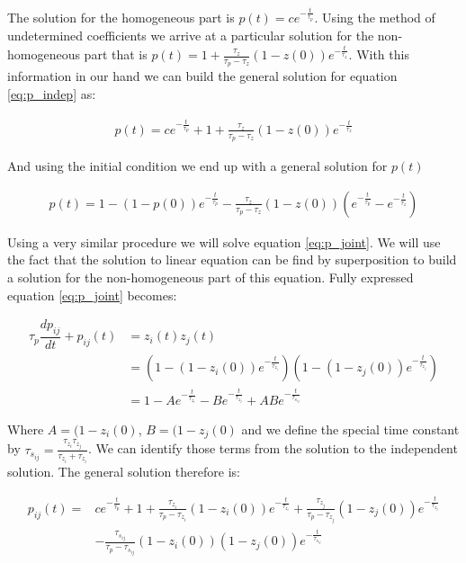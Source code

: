 \documentclass[10pt,a4paper]{article}
\begin{document}
The solution for the homogeneous part is $p(t) = ce^{-\frac{t}{\tau_p}}$. Using the method of undetermined coefficients we arrive at a particular solution for the non-homogeneous part that is $p(t) = 1 + \frac{\tau_z}{\tau_p - \tau_z}(1 - z(0)) e^{-\frac{t}{\tau_z}}$. With this information in our hand we can build the general solution for equation \eqref{eq:p_indep} as:

\begin{align*}
p(t) = c e^{-\frac{t}{\tau_p}} + 1 + \frac{\tau_z}{\tau_p - \tau_z}(1 - z(0)) e^{-\frac{t}{\tau_z}}
\end{align*}

And using the initial condition we end up with a general solution for $p(t)$

\begin{align*}
p(t) = 1 - (1 - p(0))e^{-\frac{t}{\tau_p}} - \frac{\tau_z}{\tau_p - \tau_z}(1 - z(0)) (e^{-\frac{t}{\tau_p}} -  e^{-\frac{t}{\tau_z}}) \label{eq:p_sol}
\end{align*}

Using a very similar procedure we will solve equation \eqref{eq:p_joint}. We will use the fact that the solution to linear equation can be find by superposition to build a solution for the non-homogeneous part of this equation.  Fully expressed equation \eqref{eq:p_joint} becomes:

\begin{align*}
\tau_p \dfrac{dp_{ij}}{dt} + p_{ij}(t) &= z_i(t) z_j(t) \\
&= (1 - (1 - z_i(0)) e^{-\frac{t}{\tau_{z_i}}})(1 - (1 - z_j(0)) e^{-\frac{t}{\tau_{z_j}}}) \\
&= 1 - Ae^{-\frac{t}{\tau_{z_i}}} -  Be^{-\frac{t}{\tau_{z_j}}}  + ABe^{-\frac{t}{\tau_{s_{ij}}}}
\end{align*}

Where $A = (1 - z_i(0)$, $B=(1 - z_j(0)$ and we define the special time constant by $\tau_{s_{ij}} = \frac{\tau_{z_i} \tau_{z_j}}{\tau_{z_i} + \tau_{z_i}} $. We can identify those terms from the solution to the independent solution. The general solution therefore is:

\begin{align*}
p_{ij}(t) = & c e^{-\frac{t}{\tau_p}} + 1 +  \frac{\tau_{z_i}}{\tau_p - \tau_{z_i}}(1 - z_i(0)) e^{-\frac{t}{\tau_{z_i}}} + \frac{\tau_{z_j}}{\tau_p - \tau_{z_j}}(1 - z_j(0)) e^{-\frac{t}{\tau_{z_j}}}  \\ 
& - \frac{\tau_{s_{ij}}}{\tau_p - \tau_{s_{ij}}} (1 - z_i(0))(1 - z_j(0)) e^{-\frac{t}{\tau_{s_{ij}}}} 
\end{align*}
\end{document}
